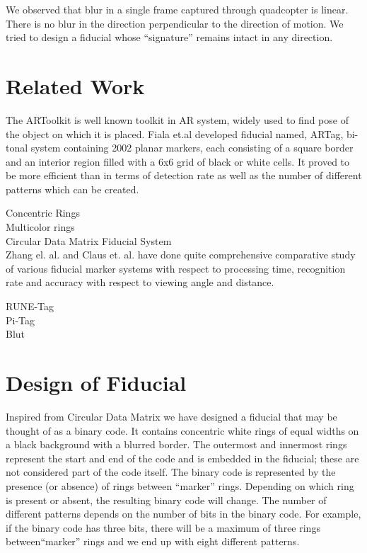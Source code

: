 \documentclass[runningheads]{llncs}
\begin{document}
We observed that blur in a single frame captured through quadcopter is linear.
There is no blur in the direction perpendicular to the direction of motion. We
tried to design a fiducial whose ``signature'' remains intact in any direction.

 
\section{Related Work}
The ARToolkit \cite{ARToolkit02} \cite{kato-artoolkit} is well known toolkit in
AR system, widely used to find pose of the object on which it is placed.
Fiala et.al \cite{Fiala05} developed fiducial named, ARTag, bi-tonal system
containing 2002 planar markers, each consisting of a square border and an
interior region filled with a 6x6 grid of black or white cells. It proved to be
more efficient than \cite{ARToolkit02} in terms of detection rate as well as the
number of different patterns which can be created.  

Concentric Rings\cite{concentric} \\
Multicolor rings \cite{Cho:2001} \cite{Cho97fastcolor} \\
Circular Data Matrix Fiducial System \cite{NaimarkF02} \\

Zhang el. al.\cite{Zhang:2002} and Claus et. al. \cite{ClausF04} have done
quite comprehensive comparative study of various fiducial marker systems with
respect to processing time, recognition rate and accuracy with
respect to viewing angle and distance.

RUNE-Tag \cite{runetag11} \\
Pi-Tag \cite{Pitag13} \\
Blut \cite{Wu:2011}


\section{Design of Fiducial}
Inspired from Circular Data Matrix\cite{NaimarkF02} we have designed a fiducial
that may be thought of as a binary code.  It contains concentric white rings of
equal widths on a black background with a blurred border. The outermost and
innermost rings represent the start and end of the code and is embedded in the
fiducial; these are not considered part of the code itself. The binary code is
represented by the presence (or absence) of rings between ``marker'' rings.
Depending on which ring is present or absent, the resulting binary code will
change. The number of different patterns depends on the number of bits in the
binary code. For example, if the binary code has three bits, there will be a
maximum of three rings between``marker'' rings and we end up with eight
different patterns.
\end{document}

